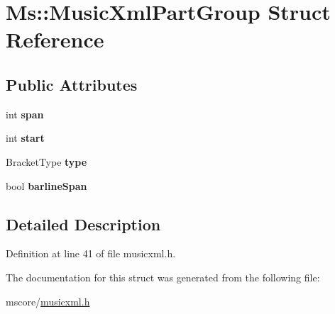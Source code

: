 \hypertarget{struct_ms_1_1_music_xml_part_group}{}\section{Ms\+:\+:Music\+Xml\+Part\+Group Struct Reference}
\label{struct_ms_1_1_music_xml_part_group}
\subsection*{Public Attributes}
\begin{DoxyCompactItemize}
\item 
\mbox{\label{struct_ms_1_1_music_xml_part_group_aa3e0c9655dcef66af90208b37223161b}} 
int {\bfseries span}
\item 
\mbox{\label{struct_ms_1_1_music_xml_part_group_a4e85c1fda1164d50b20921ba447255f4}} 
int {\bfseries start}
\item 
\mbox{\label{struct_ms_1_1_music_xml_part_group_a439c967b6880da02036457c9b41f9a73}} 
Bracket\+Type {\bfseries type}
\item 
\mbox{\label{struct_ms_1_1_music_xml_part_group_a70ab57475c3ce254182677c8a79c2eab}} 
bool {\bfseries barline\+Span}
\end{DoxyCompactItemize}


\subsection{Detailed Description}


Definition at line 41 of file musicxml.\+h.



The documentation for this struct was generated from the following file\+:\begin{DoxyCompactItemize}
\item 
mscore/\hyperlink{musicxml_8h}{musicxml.\+h}\end{DoxyCompactItemize}
